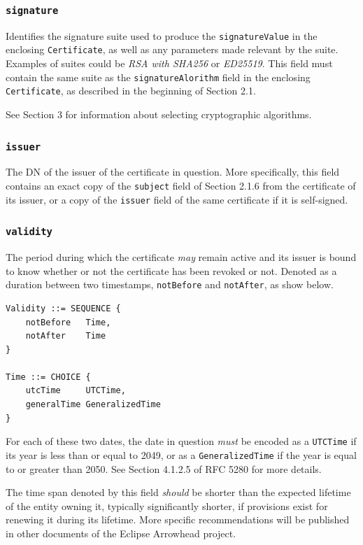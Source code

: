 \subsubsection{\texttt{signature}}

Identifies the signature suite used to produce the \texttt{signatureValue} in the enclosing \texttt{Certificate}, as well as any parameters made relevant by the suite.
Examples of suites could be \textit{RSA with SHA256} or \textit{ED25519}.
This field must contain the same suite as the \texttt{signatureAlorithm} field in the enclosing \texttt{Certificate}, as described in the beginning of Section 2.1.

See Section 3 for information about selecting cryptographic algorithms.

\subsubsection{\texttt{issuer}}

The DN of the issuer of the certificate in question.
More specifically, this field contains an exact copy of the \texttt{subject} field of Section 2.1.6 from the certificate of its issuer, or a copy of the \texttt{issuer} field of the same certificate if it is self-signed.

\subsubsection{\texttt{validity}}

The period during which the certificate \textit{may} remain active and its issuer is bound to know whether or not the certificate has been revoked or not.
Denoted as a duration between two timestamps, \texttt{notBefore} and \texttt{notAfter}, as show below.

\begin{verbatim}
Validity ::= SEQUENCE {
    notBefore   Time,
    notAfter    Time
}

Time ::= CHOICE {
    utcTime     UTCTime,
    generalTime GeneralizedTime
}
\end{verbatim}

For each of these two dates, the date in question \textit{must} be encoded as a \texttt{UTCTime} if its year is less than or equal to 2049, or as a \texttt{GeneralizedTime} if the year is equal to or greater than 2050.
See Section 4.1.2.5 of RFC 5280 for more details.

The time span denoted by this field \textit{should} be shorter than the expected lifetime of the entity owning it, typically significantly shorter, if provisions exist for renewing it during its lifetime.
More specific recommendations will be published in other documents of the Eclipse Arrowhead project.

